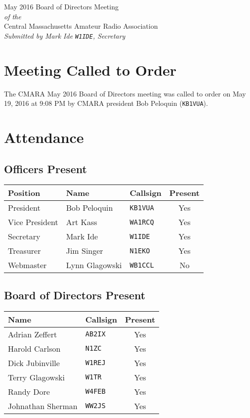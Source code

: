 \documentclass[10pt,letterpaper]{article}
\begin{document}
\begin{center}
{\huge May 2016 Board of Directors Meeting}\\
\emph{of the}\\
{\Large Central Massachusetts Amateur Radio Association}\\
\emph{Submitted by Mark Ide \texttt{W1IDE}, Secretary}
\end{center}

\section{Meeting Called to Order}
The CMARA May 2016 Board of Directors meeting was called to order on May 19, 2016 at 9:08 PM by CMARA president Bob Peloquin (\texttt{KB1VUA}).

\section{Attendance}

\subsection{Officers Present}

\begin{tabular}{|l|l|l|c|}
  \hline
  \textbf{Position} & \textbf{Name}  & \textbf{Callsign} & \textbf{Present} \\ \hline
  President         & Bob Peloquin   & \texttt{KB1VUA}   & Yes \\
  Vice President    & Art Kass       & \texttt{WA1RCQ}   & Yes \\
  Secretary         & Mark Ide       & \texttt{W1IDE}    & Yes \\
  Treasurer         & Jim Singer     & \texttt{N1EKO}    & Yes  \\
  Webmaster         & Lynn Glagowski & \texttt{WB1CCL}   & No  \\
  \hline
\end{tabular}

\subsection{Board of Directors Present}

\begin{tabular}{|l|l|c|}
  \hline
  \textbf{Name}     & \textbf{Callsign} & \textbf{Present} \\ \hline
  Adrian Zeffert    & \texttt{AB2IX}    & Yes \\
  Harold Carlson    & \texttt{N1ZC}     & Yes \\
  Dick Jubinville   & \texttt{W1REJ}    & Yes \\
  Terry Glagowski   & \texttt{W1TR}     & Yes \\
  Randy Dore        & \texttt{W4FEB}    & Yes \\
  Johnathan Sherman & \texttt{WW2JS}    & Yes \\
  \hline
\end{tabular}
\end{document}

